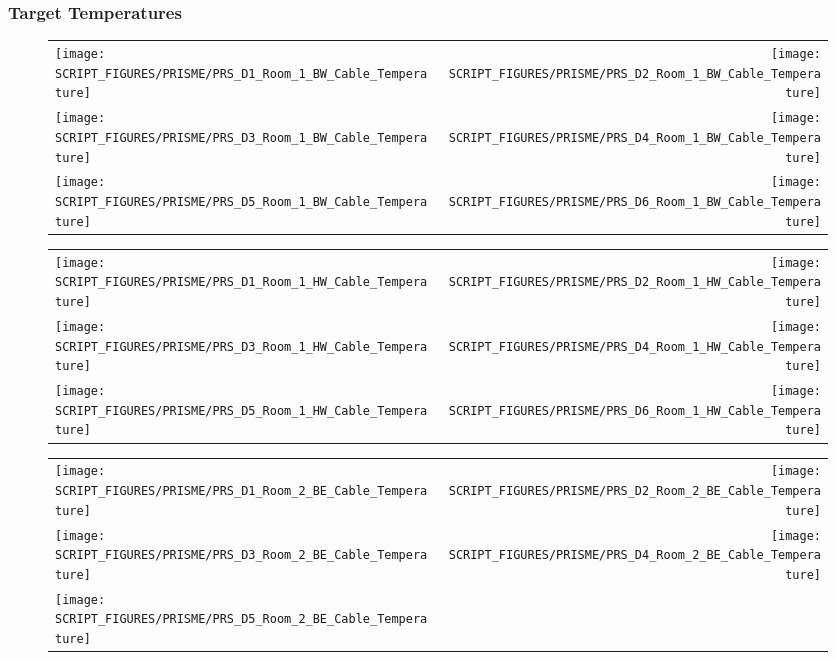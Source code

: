 \clearpage

\subsubsection{Target Temperatures}

\begin{figure}[p]
\begin{tabular*}{\textwidth}{l@{\extracolsep{\fill}}r}
\texttt{[image: SCRIPT\_FIGURES/PRISME/PRS\_D1\_Room\_1\_BW\_Cable\_Temperature]} &
\texttt{[image: SCRIPT\_FIGURES/PRISME/PRS\_D2\_Room\_1\_BW\_Cable\_Temperature]} \\
\texttt{[image: SCRIPT\_FIGURES/PRISME/PRS\_D3\_Room\_1\_BW\_Cable\_Temperature]} &
\texttt{[image: SCRIPT\_FIGURES/PRISME/PRS\_D4\_Room\_1\_BW\_Cable\_Temperature]} \\
\texttt{[image: SCRIPT\_FIGURES/PRISME/PRS\_D5\_Room\_1\_BW\_Cable\_Temperature]} &
\texttt{[image: SCRIPT\_FIGURES/PRISME/PRS\_D6\_Room\_1\_BW\_Cable\_Temperature]}
\end{tabular*}
\label{PRISME_BW_Cable_Room_1}
\end{figure}

\begin{figure}[p]
\begin{tabular*}{\textwidth}{l@{\extracolsep{\fill}}r}
\texttt{[image: SCRIPT\_FIGURES/PRISME/PRS\_D1\_Room\_1\_HW\_Cable\_Temperature]} &
\texttt{[image: SCRIPT\_FIGURES/PRISME/PRS\_D2\_Room\_1\_HW\_Cable\_Temperature]} \\
\texttt{[image: SCRIPT\_FIGURES/PRISME/PRS\_D3\_Room\_1\_HW\_Cable\_Temperature]} &
\texttt{[image: SCRIPT\_FIGURES/PRISME/PRS\_D4\_Room\_1\_HW\_Cable\_Temperature]} \\
\texttt{[image: SCRIPT\_FIGURES/PRISME/PRS\_D5\_Room\_1\_HW\_Cable\_Temperature]} &
\texttt{[image: SCRIPT\_FIGURES/PRISME/PRS\_D6\_Room\_1\_HW\_Cable\_Temperature]}
\end{tabular*}
\label{PRISME_HW_Cable_Room_1}
\end{figure}

\begin{figure}[p]
\begin{tabular*}{\textwidth}{l@{\extracolsep{\fill}}r}
\texttt{[image: SCRIPT\_FIGURES/PRISME/PRS\_D1\_Room\_2\_BE\_Cable\_Temperature]} &
\texttt{[image: SCRIPT\_FIGURES/PRISME/PRS\_D2\_Room\_2\_BE\_Cable\_Temperature]} \\
\texttt{[image: SCRIPT\_FIGURES/PRISME/PRS\_D3\_Room\_2\_BE\_Cable\_Temperature]} &
\texttt{[image: SCRIPT\_FIGURES/PRISME/PRS\_D4\_Room\_2\_BE\_Cable\_Temperature]} \\
\texttt{[image: SCRIPT\_FIGURES/PRISME/PRS\_D5\_Room\_2\_BE\_Cable\_Temperature]} &

\end{tabular*}
\label{PRISME_BE_Cable_Room_2}
\end{figure}


